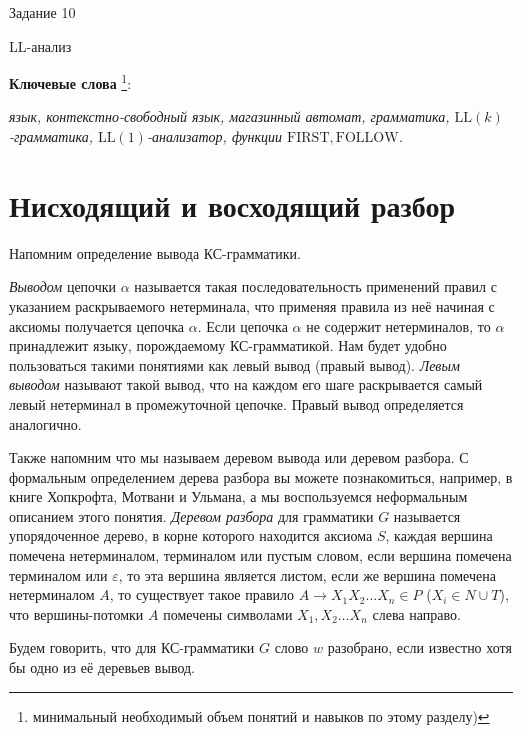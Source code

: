 \documentclass[12pt]{article}
\theoremstyle{definiton}
\theoremstyle{definition}
\theoremstyle{definition}
\theoremstyle{definition}
\let\eps\varepsilon
\def\first{\mathrm{ FIRST} }
\def\follow{\mathrm{ FOLLOW} }
\def\LL{{\mathrm{LL}}}
\begin{document}
\centerline{\LARGE Задание 10}

\medskip

\begin{center}
	{\Large LL-анализ}
\end{center}

\bigskip

{\bf Ключевые слова }\footnote{минимальный необходимый объем понятий и навыков по
этому разделу)}:{\em  язык, контекстно-свободный язык, магазинный автомат, грамматика, $\LL(k)$-грамматика, $\LL(1)$-анализатор, функции $\first, \follow$. %

}

\section{Нисходящий и восходящий разбор}

Напомним определение вывода КС-грамматики.

\emph{Выводом} цепочки $\alpha$ называется такая последовательность применений правил с указанием раскрываемого нетерминала, что применяя правила из неё начиная с аксиомы получается цепочка $\alpha$. Если цепочка $\alpha$ не содержит нетерминалов, то $\alpha$ принадлежит языку, порождаемому КС-грамматикой. Нам будет удобно пользоваться такими понятиями как левый вывод (правый вывод).  \emph{Левым выводом} называют такой вывод, что на каждом его шаге раскрывается самый левый нетерминал в промежуточной цепочке. Правый вывод определяется аналогично.




Также напомним что мы называем деревом вывода или деревом разбора. С формальным определением дерева разбора вы можете познакомиться, например, в книге Хопкрофта, Мотвани и Ульмана, а мы воспользуемся неформальным описанием этого понятия. \emph{Деревом разбора} для грамматики $G$  называется упорядоченное дерево, в корне которого находится аксиома $S$, каждая вершина помечена нетерминалом, терминалом или пустым словом, если вершина помечена терминалом или $\eps$, то эта вершина является листом, если же вершина помечена нетерминалом $A$, то существует такое правило $ A \to X_1X_2\ldots X_n \in P$ ($X_i \in N\cup T$), что вершины-потомки $A$ помечены символами $X_1, X_2\ldots X_n$ слева направо.

Будем говорить, что для КС-грамматики $G$ слово $w$ разобрано, если известно хотя бы одно из её деревьев вывод.
\end{document}
